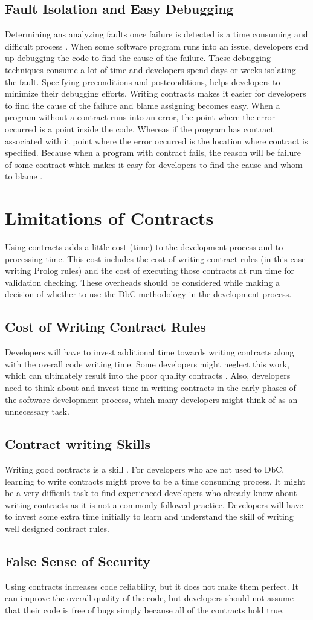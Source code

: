 \subsection{Fault Isolation and Easy Debugging}
Determining ans analyzing faults once failure is detected is a time consuming and difficult process \cite{briand2002investigating}. When some software program runs into an issue, developers end up debugging the code to find the   cause of the failure. These debugging techniques consume a lot of time and developers spend days or weeks isolating the fault. 
Specifying preconditions and postconditions, helps developers to minimize their debugging efforts. Writing contracts makes it easier for developers to find the cause of the failure and blame assigning becomes easy.
When a program without a contract runs into an error, the point where the error occurred is a point inside the code. Whereas if the program has contract associated with it point where the error occurred is the location where contract is specified\cite{briand2002investigating}. Because when a program with contract fails, the reason will be failure of some contract which makes it easy for developers to find the cause and whom to blame \cite{dimoulas2011correct}.     
\section{Limitations of Contracts}
Using contracts adds a little cost (time) to the development process and to processing time. This cost includes the cost of writing contract rules (in this case writing Prolog rules) and the cost of executing those contracts at run time for validation checking. These overheads should be considered while making a decision of whether to use the DbC methodology in the development process.

\subsection{Cost of Writing Contract Rules}
Developers will have to invest additional time towards writing contracts along with the overall code writing time. Some developers might neglect this work, which can ultimately result into the poor quality contracts \cite{ApplyingDesignByContract}.
Also, developers need to think about and invest time in writing contracts in the early phases of the software development process, which many developers might think of as an unnecessary task.

\subsection{Contract writing Skills}
Writing good contracts is a skill \cite{DesignByContractByExample}. For developers who are not used to DbC, learning to write contracts might prove to be a time consuming process. It might be a very difficult task to find experienced developers who already know about writing contracts as it is not a commonly followed practice. Developers will have to invest some extra time initially to learn and understand the skill of writing well designed contract rules.

\subsection{False Sense of Security}
Using contracts increases code reliability, but it does not make them perfect. It can improve the overall quality of the code, but developers should not assume that their code is free of bugs simply because all of the contracts hold true.
